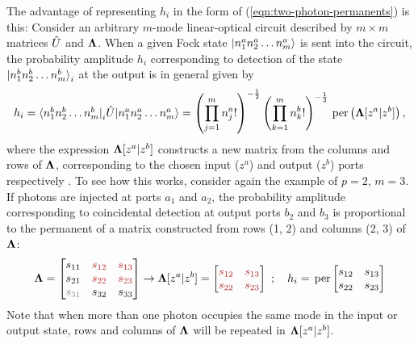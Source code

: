 The advantage of representing $h_i$ in the form of (\ref{eqn:two-photon-permanents}) is this:
%
%
Consider an arbitrary $m$-mode linear-optical circuit described by $m \times m$ matrices $\hat{U}$ and $\mathbf{\Lambda}$. When a given Fock state $\mbox{$ | n_1^a n_2^a \ldots n_m^a \rangle $}$ is sent into the circuit, the probability amplitude $h_i$ corresponding to detection of the state $\mbox{$ | n_1^b n_2^b \ldots n_m^b \rangle $}_i$ at the output is in general given by
\begin{equation}
    h_i = \mbox{$ \langle n_1^b n_2^b \ldots n_m^b | $}_i \hat{U} \mbox{$ | n_1^a n_2^a \ldots n_m^a \rangle $} =
    \left(\prod_{j=1}^m n_j^a! \right)^{-\frac{1}{2}}
    \left(\prod_{k=1}^m n_k^b! \right)^{-\frac{1}{2}}
    \,\mathrm{per} \left(\mathbf{\Lambda}[z^a | z^b] \right),
    \label{eqn:permanent-fock-state}
\end{equation}
where the expression $\mathbf{\Lambda}[z^a | z^b]$ constructs a new matrix from the columns and rows of $\mathbf{\Lambda}$,  corresponding to the chosen input ($z^a$) and output ($z^b$) ports respectively \cite{Scheel2004a}. To see how this works, consider again the example of $p=2$, $m=3$. If photons are injected at ports $a_1$ and $a_2$, the probability amplitude corresponding to coincidental detection at output ports $b_2$ and $b_3$ is proportional to the permanent of a matrix constructed from rows (1, 2) and columns (2, 3) of $\mathbf{\Lambda}$:
\begin{equation}
\transfer = 
\begin{bmatrix}
    \textcolor{black}{s_{11}} & \textcolor{rr}{s_{12}} & \textcolor{rr}{s_{13}} \\
    \textcolor{black}{s_{21}} & \textcolor{rr}{s_{22}} & \textcolor{rr}{s_{23}} \\
    \textcolor{gg}{s_{31}} & \textcolor{black}{s_{32}} & \textcolor{black}{s_{33}}
\end{bmatrix}
    \rightarrow 
    \transfer[z^a | z^b]= 
\begin{bmatrix}
    \textcolor{rr}{s_{12}} & \textcolor{rr}{s_{13}}  \\
    \textcolor{rr}{s_{22}} & \textcolor{rr}{s_{23}} 
\end{bmatrix} ~;\quad
    h_i = 
    \perm 
\begin{bmatrix}
    \textcolor{black}{s_{12}} & \textcolor{black}{s_{13}}  \\
    \textcolor{black}{s_{22}} & \textcolor{black}{s_{23}}  
\end{bmatrix} 
\end{equation}
Note that when more than one photon occupies the same mode in the input or output state, rows and columns of $\mathbf{\Lambda}$ will be repeated in $\mathbf{\Lambda}[z^a | z^b]$. 

